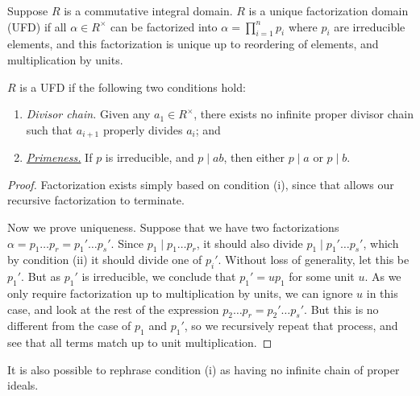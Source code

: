 \begin{definition}
    Suppose \(R\) is a commutative integral domain.
    \(R\) is a unique factorization domain (UFD)
    if all \(\alpha \in R^\times\) can be factorized into
    \(\alpha = \prod_{i=1}^n p_i\) where \(p_i\) are irreducible elements,
    and this factorization is unique up to reordering of elements,
    and multiplication by units.
\end{definition}
\begin{theorem}\label{thm:ufd-conditions}
    \(R\) is a UFD if the following two conditions hold:
    \begin{enumerate}[label={(\roman*)}, itemsep=0mm]
        \item \textit{Divisor chain.}
            Given any \(a_1 \in R^\times\),
            there exists no infinite proper divisor chain
            such that \(a_{i+1}\) properly divides \(a_i\); and
        \item \textit{\hyperref[lem:euclid]{Primeness.}}
            If \(p\) is irreducible, and \(p \mid ab\),
            then either \(p \mid a\) or \(p \mid b\).
    \end{enumerate}
\end{theorem}
\begin{proof}
    Factorization exists simply based on condition (i),
    since that allows our recursive factorization to terminate.

    Now we prove uniqueness.
    Suppose that we have two factorizations
    \(\alpha = p_1 \hdots p_r = p_1' \hdots p_s'\).
    Since \(p_1 \mid p_1 \hdots p_r\),
    it should also divide \(p_1 \mid p_1' \hdots p_s'\),
    which by condition (ii) it should divide one of \(p_i'\).
    Without loss of generality, let this be \(p_1'\).
    But as \(p_1'\) is irreducible,
    we conclude that \(p_1' = up_1\) for some unit \(u\).
    As we only require factorization up to multiplication by units,
    we can ignore \(u\) in this case,
    and look at the rest of the expression \(p_2 \hdots p_r = p_2' \hdots p_s'\).
    But this is no different from the case of \(p_1\) and \(p_1'\),
    so we recursively repeat that process,
    and see that all terms match up to unit multiplication.
\end{proof}
\begin{remark}
    It is also possible to rephrase condition (i)
    as having no infinite chain of proper ideals.
\end{remark}

